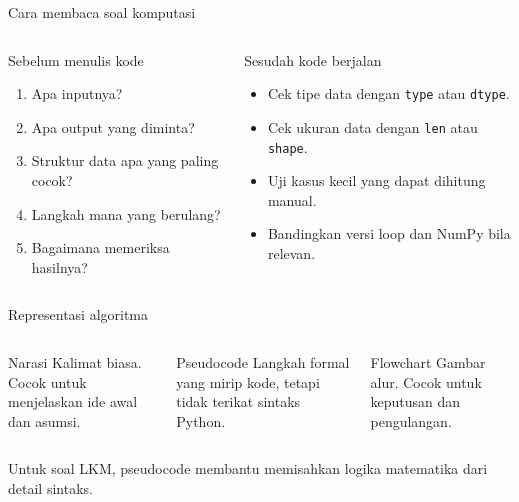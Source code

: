 \documentclass[aspectratio=169,11pt]{beamer}
\begin{document}
\begin{frame}{Cara membaca soal komputasi}
\begin{columns}[T]
\begin{block}{Sebelum menulis kode}
\begin{enumerate}\small
  \item Apa inputnya?
  \item Apa output yang diminta?
  \item Struktur data apa yang paling cocok?
  \item Langkah mana yang berulang?
  \item Bagaimana memeriksa hasilnya?
\end{enumerate}
\end{block}
\begin{block}{Sesudah kode berjalan}
\begin{itemize}
  \item Cek tipe data dengan \texttt{type} atau \texttt{dtype}.
  \item Cek ukuran data dengan \texttt{len} atau \texttt{shape}.
  \item Uji kasus kecil yang dapat dihitung manual.
  \item Bandingkan versi loop dan NumPy bila relevan.
\end{itemize}
\end{block}
\end{columns}
\end{frame}

\begin{frame}{Representasi algoritma}
\begin{columns}[T]
\begin{block}{Narasi}
Kalimat biasa. Cocok untuk menjelaskan ide awal dan asumsi.
\end{block}
\begin{block}{Pseudocode}
Langkah formal yang mirip kode, tetapi tidak terikat sintaks Python.
\end{block}
\begin{block}{Flowchart}
Gambar alur. Cocok untuk keputusan dan pengulangan.
\end{block}
\end{columns}
\vspace{3mm}
\colorbox{LightTeal}{\parbox{.96\linewidth}{\small Untuk soal LKM, pseudocode membantu memisahkan logika matematika dari detail sintaks.}}
\end{frame}
\end{document}
